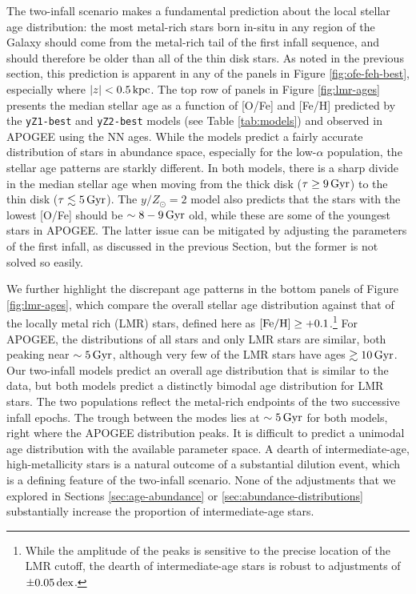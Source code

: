 \documentclass[twocolumn,twocolappendix,linenumbers]{aastex631}
\newcommand{\mathFeH}{{\rm [Fe/H]}}
\newcommand{\yZ}[1]{$y/Z_\odot=#1$}
\newcommand{\kpc}{\,{\rm kpc}}
\newcommand{\Gyr}{\,{\rm Gyr}}
\newcommand{\dex}{\,{\rm dex}}
\begin{document}
The two-infall scenario makes a fundamental prediction about the local stellar age distribution: the most metal-rich stars born in-situ in any region of the Galaxy should come from the metal-rich tail of the first infall sequence, and should therefore be older than all of the thin disk stars. As noted in the previous section, this prediction is apparent in any of the panels in Figure \ref{fig:ofe-feh-best}, especially where $|z|<0.5\kpc$. The top row of panels in Figure \ref{fig:lmr-ages} presents the median stellar age as a function of [O/Fe] and [Fe/H] predicted by the {\tt yZ1-best} and {\tt yZ2-best} models (see Table \ref{tab:models}) and observed in APOGEE using the \citet{leung_variational_2023} NN ages. While the models predict a fairly accurate distribution of stars in abundance space, especially for the low-$\alpha$ population, the stellar age patterns are starkly different. In both models, there is a sharp divide in the median stellar age when moving from the thick disk ($\tau\ge9\Gyr$) to the thin disk ($\tau\lesssim5\Gyr$). The \yZ{2} model also predicts that the stars with the lowest [O/Fe] should be $\sim8-9\Gyr$ old, while these are some of the youngest stars in APOGEE. The latter issue can be mitigated by adjusting the parameters of the first infall, as discussed in the previous Section, but the former is not solved so easily.

We further highlight the discrepant age patterns in the bottom panels of Figure \ref{fig:lmr-ages}, which compare the overall stellar age distribution against that of the locally metal rich (LMR) stars, defined here as $\mathFeH\ge+0.1$.\footnote{
    While the amplitude of the peaks is sensitive to the precise location of the LMR cutoff, the dearth of intermediate-age stars is robust to adjustments of $\pm0.05\dex$.
} For APOGEE, the distributions of all stars and only LMR stars are similar, both peaking near $\sim5\Gyr$, although very few of the LMR stars have ages $\gtrsim10\Gyr$. Our two-infall models predict an overall age distribution that is similar to the data, but both models predict a distinctly bimodal age distribution for LMR stars. The two populations reflect the metal-rich endpoints of the two successive infall epochs. The trough between the modes lies at $\sim5\Gyr$ for both models, right where the APOGEE distribution peaks. It is difficult to predict a unimodal age distribution with the available parameter space. A dearth of intermediate-age, high-metallicity stars is a natural outcome of a substantial dilution event, which is a defining feature of the two-infall scenario. None of the adjustments that we explored in Sections \ref{sec:age-abundance} or \ref{sec:abundance-distributions} substantially increase the proportion of intermediate-age stars.
\end{document}
